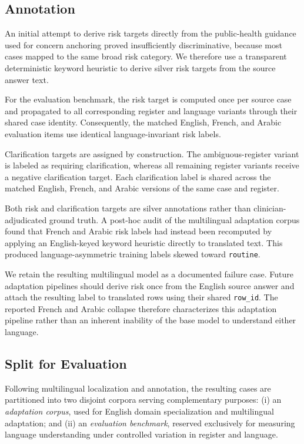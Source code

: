 \subsection{Annotation}
\label{sec:gold-labels}

An initial attempt to derive risk targets directly from the public-health
guidance used for concern anchoring proved insufficiently discriminative,
because most cases mapped to the same broad risk category. We therefore use a
transparent deterministic keyword heuristic to derive silver risk targets
from the source answer text.

For the evaluation benchmark, the risk target is computed once per source
case and propagated to all corresponding register and language variants
through their shared case identity. Consequently, the matched English,
French, and Arabic evaluation items use identical language-invariant risk
labels.

Clarification targets are assigned by construction. The ambiguous-register
variant is labeled as requiring clarification, whereas all remaining
register variants receive a negative clarification target. Each
clarification label is shared across the matched English, French, and Arabic
versions of the same case and register.

Both risk and clarification targets are silver annotations rather than
clinician-adjudicated ground truth. A post-hoc audit of the multilingual
adaptation corpus found that French and Arabic risk labels had instead been
recomputed by applying an English-keyed keyword heuristic directly to
translated text. This produced language-asymmetric training labels skewed
toward \texttt{routine}.

We retain the resulting multilingual model as a documented failure case.
Future adaptation pipelines should derive risk once from the English source
answer and attach the resulting label to translated rows using their shared
\texttt{row\_id}. The reported French and Arabic collapse therefore
characterizes this adaptation pipeline rather than an inherent inability of
the base model to understand either language.


\subsection{Split for Evaluation}

Following multilingual localization and annotation, the resulting cases are
partitioned into two disjoint corpora serving complementary purposes: (i) an \emph{adaptation corpus}, used for English domain
    specialization and multilingual adaptation; and
    (ii) an \emph{evaluation benchmark}, reserved exclusively for
    measuring language understanding under controlled variation in register
    and language.




